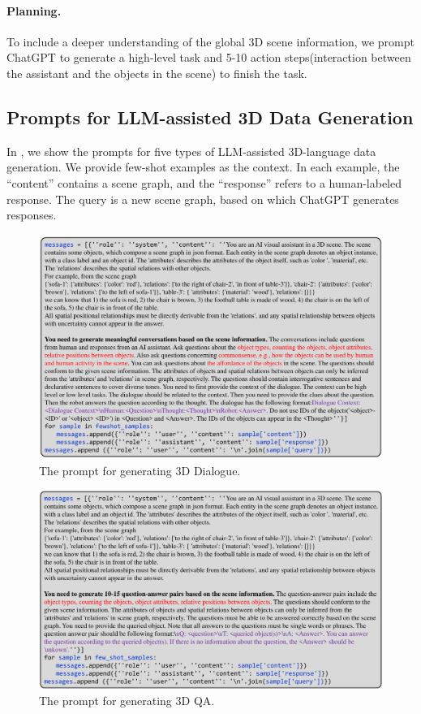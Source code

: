\paragraph{Planning.} To include a deeper understanding of the global 3D scene information, we prompt ChatGPT to generate a high-level task and 5-10 action steps(interaction between the assistant and the objects in the scene) to finish the task.

\subsection{Prompts for LLM-assisted 3D Data Generation}\label{app:dataset:prompt}
In , we show the prompts for five types of LLM-assisted 3D-language data generation. We provide few-shot examples as the context. In each example, the ``content'' contains a scene graph, and the ``response'' refers to a human-labeled response. The query is a new scene graph, based on which ChatGPT \citep{openai2022chatgpt} generates responses.


\begin{figure}[t!]
\centering
\includegraphics[width=\textwidth, keepaspectratio]{figs/prompt_dialogue.pdf}%
  \caption{The prompt for generating 3D Dialogue.}
  \label{fig:prompt:dialogue}
\end{figure}

\begin{figure}[t!]
\centering
\includegraphics[width=\textwidth, keepaspectratio]{figs/prompt_QA.pdf}%
  \caption{The prompt for generating 3D QA.}
  \label{fig:prompt:QA}
\end{figure}

